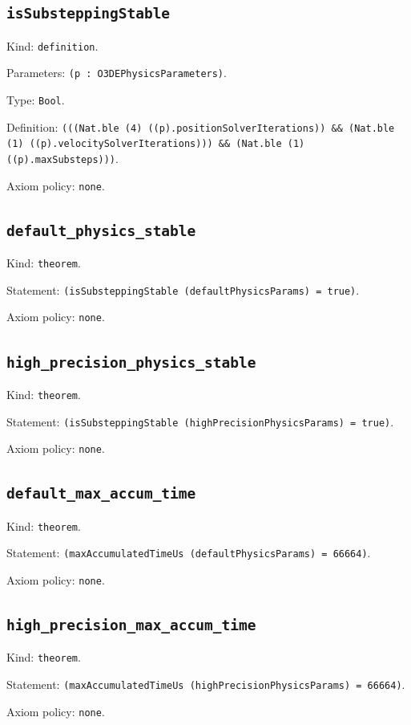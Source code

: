 \documentclass[11pt]{article}
\begin{document}
\subsection*{\texttt{isSubsteppingStable}}
\noindent Kind: \texttt{definition}.\par
\noindent Parameters: \texttt{(p : O3DEPhysicsParameters)}.\par
\noindent Type: \texttt{Bool}.\par
\noindent Definition: \texttt{(((Nat.ble (4) ((p).positionSolverIterations)) \&\& (Nat.ble (1) ((p).velocitySolverIterations))) \&\& (Nat.ble (1) ((p).maxSubsteps)))}.\par
\noindent Axiom policy: \texttt{none}.\par
\subsection*{\texttt{default\_physics\_stable}}
\noindent Kind: \texttt{theorem}.\par
\noindent Statement: \texttt{(isSubsteppingStable (defaultPhysicsParams) = true)}.\par
\noindent Axiom policy: \texttt{none}.\par
\subsection*{\texttt{high\_precision\_physics\_stable}}
\noindent Kind: \texttt{theorem}.\par
\noindent Statement: \texttt{(isSubsteppingStable (highPrecisionPhysicsParams) = true)}.\par
\noindent Axiom policy: \texttt{none}.\par
\subsection*{\texttt{default\_max\_accum\_time}}
\noindent Kind: \texttt{theorem}.\par
\noindent Statement: \texttt{(maxAccumulatedTimeUs (defaultPhysicsParams) = 66664)}.\par
\noindent Axiom policy: \texttt{none}.\par
\subsection*{\texttt{high\_precision\_max\_accum\_time}}
\noindent Kind: \texttt{theorem}.\par
\noindent Statement: \texttt{(maxAccumulatedTimeUs (highPrecisionPhysicsParams) = 66664)}.\par
\noindent Axiom policy: \texttt{none}.\par
\end{document}
